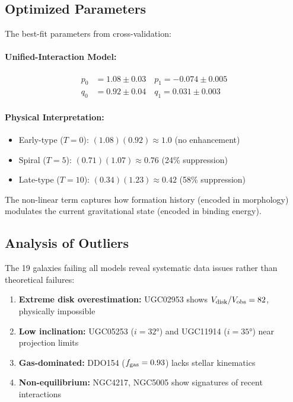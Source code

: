 \documentclass[aps,prd,twocolumn,superscriptaddress,nofootinbib,longbibliography]{revtex4-2}
\begin{document}
\subsection{Optimized Parameters}

The best-fit parameters from cross-validation:

\paragraph{Unified-Interaction Model:}
\begin{align}
p_0 &= 1.08 \pm 0.03 \quad p_1 = -0.074 \pm 0.005 \\
q_0 &= 0.92 \pm 0.04 \quad q_1 = 0.031 \pm 0.003
\end{align}

\paragraph{Physical Interpretation:}
\begin{itemize}
\item Early-type ($T=0$): $(1.08)(0.92) \approx 1.0$ (no enhancement)
\item Spiral ($T=5$): $(0.71)(1.07) \approx 0.76$ (24\% suppression)
\item Late-type ($T=10$): $(0.34)(1.23) \approx 0.42$ (58\% suppression)
\end{itemize}

The non-linear term captures how formation history (encoded in morphology) modulates the current gravitational state (encoded in binding energy).

\subsection{Analysis of Outliers}

The 19 galaxies failing all models reveal systematic data issues rather than theoretical failures:

\begin{enumerate}
\item \textbf{Extreme disk overestimation:} UGC02953 shows $V_{\rm disk}/V_{\rm obs} = 82$, physically impossible
\item \textbf{Low inclination:} UGC05253 ($i = 32°$) and UGC11914 ($i = 35°$) near projection limits
\item \textbf{Gas-dominated:} DDO154 ($f_{\rm gas} = 0.93$) lacks stellar kinematics
\item \textbf{Non-equilibrium:} NGC4217, NGC5005 show signatures of recent interactions
\end{enumerate}
\end{document}
